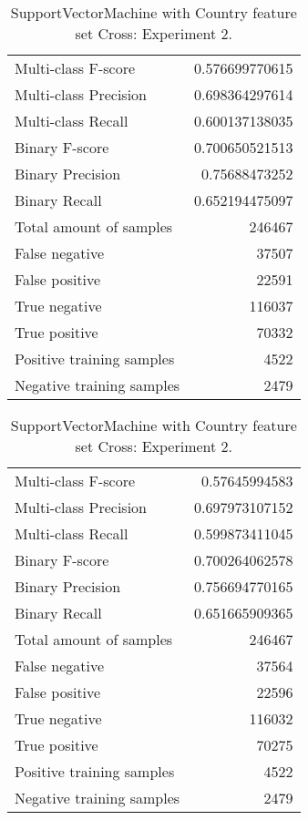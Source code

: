 \begin{table}[H]
\begin{minipage}{0.5\textwidth}
\caption{SupportVectorMachine with Country feature set Cross: Experiment 1.}
\centering
\begin{tabular}{l r}
\toprule
Multi-class F-score & 0.576699770615 \\
Multi-class Precision & 0.698364297614 \\
Multi-class Recall & 0.600137138035 \\
\midrule
Binary F-score & 0.700650521513 \\
Binary Precision & 0.75688473252 \\
Binary Recall & 0.652194475097 \\
\midrule
Total amount of samples & 246467 \\
False negative & 37507 \\
False positive & 22591 \\
True negative & 116037 \\
True positive & 70332 \\
\midrule
Positive training samples & 4522 \\
Negative training samples & 2479 \\
\bottomrule
\end{tabular}
\end{minipage}
\hfillx
\begin{minipage}{0.5\textwidth}
\caption{SupportVectorMachine with Country feature set Cross: Experiment 2.}
\centering
\begin{tabular}{l r}
\toprule
Multi-class F-score & 0.57645994583 \\
Multi-class Precision & 0.697973107152 \\
Multi-class Recall & 0.599873411045 \\
\midrule
Binary F-score & 0.700264062578 \\
Binary Precision & 0.756694770165 \\
Binary Recall & 0.651665909365 \\
\midrule
Total amount of samples & 246467 \\
False negative & 37564 \\
False positive & 22596 \\
True negative & 116032 \\
True positive & 70275 \\
\midrule
Positive training samples & 4522 \\
Negative training samples & 2479 \\
\bottomrule
\end{tabular}
\end{minipage}
\end{table}
